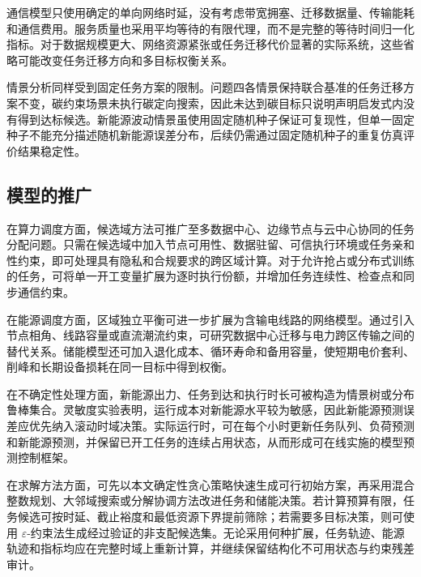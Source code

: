 通信模型只使用确定的单向网络时延，没有考虑带宽拥塞、迁移数据量、传输能耗和通信费用。服务质量也采用平均等待的有限代理，而不是完整的等待时间归一化指标。对于数据规模更大、网络资源紧张或任务迁移代价显著的实际系统，这些省略可能改变任务迁移方向和多目标权衡关系。

情景分析同样受到固定任务方案的限制。问题四各情景保持联合基准的任务迁移方案不变，碳约束场景未执行碳定向搜索，因此未达到碳目标只说明声明启发式内没有得到达标候选。新能源波动情景虽使用固定随机种子保证可复现性，但单一固定种子不能充分描述随机新能源误差分布，后续仍需通过固定随机种子的重复仿真评价结果稳定性。

\subsection{模型的推广}

在算力调度方面，候选域方法可推广至多数据中心、边缘节点与云中心协同的任务分配问题。只需在候选域中加入节点可用性、数据驻留、可信执行环境或任务亲和性约束，即可处理具有隐私和合规要求的跨区域计算。对于允许抢占或分布式训练的任务，可将单一开工变量扩展为逐时执行份额，并增加任务连续性、检查点和同步通信约束。

在能源调度方面，区域独立平衡可进一步扩展为含输电线路的网络模型。通过引入节点相角、线路容量或直流潮流约束，可研究数据中心迁移与电力跨区传输之间的替代关系。储能模型还可加入退化成本、循环寿命和备用容量，使短期电价套利、削峰和长期设备损耗在同一目标中得到权衡。

在不确定性处理方面，新能源出力、任务到达和执行时长可被构造为情景树或分布鲁棒集合。灵敏度实验表明，运行成本对新能源水平较为敏感，因此新能源预测误差应优先纳入滚动时域决策。实际运行时，可在每个小时更新任务队列、负荷预测和新能源预测，并保留已开工任务的连续占用状态，从而形成可在线实施的模型预测控制框架\cite{rawlings2017model}。

在求解方法方面，可先以本文确定性贪心策略快速生成可行初始方案，再采用混合整数规划、大邻域搜索或分解协调方法改进任务和储能决策。若计算预算有限，任务候选可按时延、截止裕度和最低资源下界提前筛除；若需要多目标决策，则可使用 $\varepsilon$-约束法生成经过验证的非支配候选集\cite{miettinen1999nonlinear}。无论采用何种扩展，任务轨迹、能源轨迹和指标均应在完整时域上重新计算，并继续保留结构化不可用状态与约束残差审计。
